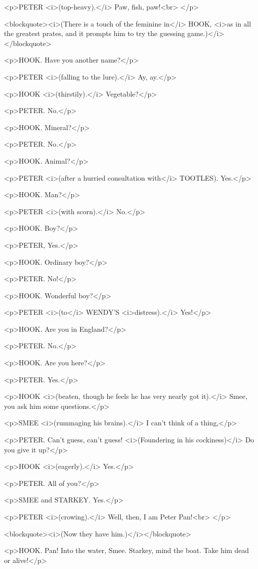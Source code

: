 <p>PETER <i>(top-heavy).</i> Paw, fish, paw!<br>
</p>

<blockquote><i>(There is a touch of the feminine in</i> HOOK, <i>as
in all the greatest prates, and it prompts him to try the guessing
game.)</i></blockquote>

<p>HOOK. Have you another name?</p>

<p>PETER <i>(falling to the lure).</i> Ay, ay.</p>

<p>HOOK <i>(thirstily).</i> Vegetable?</p>

<p>PETER. No.</p>

<p>HOOK. Mineral?</p>

<p>PETER. No.</p>

<p>HOOK. Animal?</p>

<p>PETER <i>(after a hurried consultation with</i> TOOTLES). Yes.</p>

<p>HOOK. Man?</p>

<p>PETER <i>(with scorn).</i> No.</p>

<p>HOOK. Boy?</p>

<p>PETER, Yes.</p>

<p>HOOK. Ordinary boy?</p>

<p>PETER. No!</p>

<p>HOOK. Wonderful boy?</p>

<p>PETER <i>(to</i> WENDY'S <i>distress).</i> Yes!</p>

<p>HOOK. Are you in England?</p>

<p>PETER. No.</p>

<p>HOOK. Are you here?</p>

<p>PETER. Yes.</p>

<p>HOOK <i>(beaten, though he feels he has very nearly got it).</i>
Smee, you ask him some questions.</p>

<p>SMEE <i>(rummaging his brains).</i> I can't think of a thing,</p>

<p>PETER. Can't guess, can't guess! <i>(Foundering in his
cockiness)</i> Do you give it up?</p>

<p>HOOK <i>(eagerly).</i> Yes.</p>

<p>PETER. All of you?</p>

<p>SMEE and STARKEY. Yes.</p>

<p>PETER <i>(crowing).</i> Well, then, I am Peter Pan!<br>
</p>

<blockquote><i>(Now they have him.)</i></blockquote>

<p>HOOK. Pan! Into the water, Smee. Starkey, mind the boat. Take him
dead or alive!</p>

